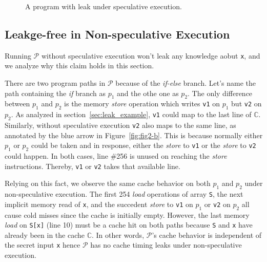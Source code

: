 \documentclass[sigconf, review]{acmart}
\newcommand{\prog}{\mathcal{P}}
\begin{document}
\begin{figure}
{\begin{minipage}{0.3\linewidth}
\end{minipage}
}
\vspace{-3ex}
\caption{A program with leak under speculative execution.}
\label{fig:motiv}
\end{figure}


\subsection{Leakge-free in Non-speculative Execution}
\label{sec:normal_exec}
Running $\prog$ without speculative execution won't leak any knowledge 
aobut \texttt{x}, and we analyze why this claim holds in this section. 


There are two program paths in $\prog$ because of the \textit{if-else} 
branch. Let's name the path containing the \textit{if} branch as $p_1$ 
and the othe one as $p_2$. The only difference between $p_1$ and $p_2$ 
is the memory \emph{store} operation which writes \texttt{v1} on $p_1$ 
but \texttt{v2} on $p_2$. As analyzed in section~\ref{sec:leak_example}, 
\texttt{v1} could map to the last line of $\mathbb{C}$. Similarly, without 
speculative execution \texttt{v2} also maps to the same line, as annotated 
by the blue arrow in Figure~\ref{fig:fig2-b}. This is because normally 
either $p_1$ or $p_2$ could be taken and in response, either the \textit{store} 
to \texttt{v1} or the \textit{store} to \texttt{v2} could happen. In both 
cases, line \#256 is unused on reaching the \textit{store} instructions. 
Thereby, \texttt{v1} or \texttt{v2} takes that available line.


Relying on this fact, we observe the same cache behavior on both $p_1$ 
and $p_2$ under non-speculative execution. The first 254 \emph{load} 
operations of array \texttt{S}, the next implicit memory read of \texttt{x},
and the succedent \textit{store} to \texttt{v1} on $p_1$ or \texttt{v2} 
on $p_2$ all cause cold misses since the cache is initially empty. However, 
the last memory \emph{load} on \texttt{S[x]} (line 10) must be a cache hit 
on both paths because \texttt{S} and \texttt{x} have already been in the 
cache $\mathbb{C}$. In other words, $\prog$'s cache behavior is independent of 
the secret input \texttt{x} hence $\prog$ has no cache timing leaks under 
non-speculative execution.
\end{document}
